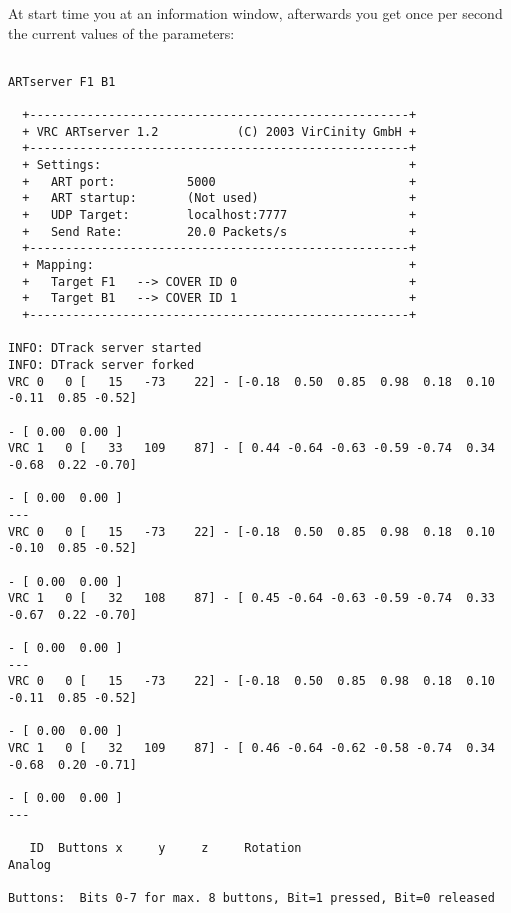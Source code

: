 At start time you at an information window, afterwards you get once per second the current values of the
parameters:


\small \begin{verbatim}

ARTserver F1 B1

  +-----------------------------------------------------+
  + VRC ARTserver 1.2           (C) 2003 VirCinity GmbH +
  +-----------------------------------------------------+
  + Settings:                                           +
  +   ART port:          5000                           +
  +   ART startup:       (Not used)                     +
  +   UDP Target:        localhost:7777                 +
  +   Send Rate:         20.0 Packets/s                 +
  +-----------------------------------------------------+
  + Mapping:                                            +
  +   Target F1   --> COVER ID 0                        +
  +   Target B1   --> COVER ID 1                        +
  +-----------------------------------------------------+

INFO: DTrack server started
INFO: DTrack server forked
VRC 0   0 [   15   -73    22] - [-0.18  0.50  0.85  0.98  0.18  0.10 -0.11  0.85 -0.52] 
                                                                       - [ 0.00  0.00 ]
VRC 1   0 [   33   109    87] - [ 0.44 -0.64 -0.63 -0.59 -0.74  0.34 -0.68  0.22 -0.70] 
                                                                       - [ 0.00  0.00 ]
---
VRC 0   0 [   15   -73    22] - [-0.18  0.50  0.85  0.98  0.18  0.10 -0.10  0.85 -0.52] 
                                                                       - [ 0.00  0.00 ]
VRC 1   0 [   32   108    87] - [ 0.45 -0.64 -0.63 -0.59 -0.74  0.33 -0.67  0.22 -0.70] 
                                                                       - [ 0.00  0.00 ]
---
VRC 0   0 [   15   -73    22] - [-0.18  0.50  0.85  0.98  0.18  0.10 -0.11  0.85 -0.52] 
                                                                       - [ 0.00  0.00 ]
VRC 1   0 [   32   109    87] - [ 0.46 -0.64 -0.62 -0.58 -0.74  0.34 -0.68  0.20 -0.71] 
                                                                       - [ 0.00  0.00 ]
---

   ID  Buttons x     y     z     Rotation                                        Analog

Buttons:  Bits 0-7 for max. 8 buttons, Bit=1 pressed, Bit=0 released

\end{verbatim} \normalsize
\clearpage

